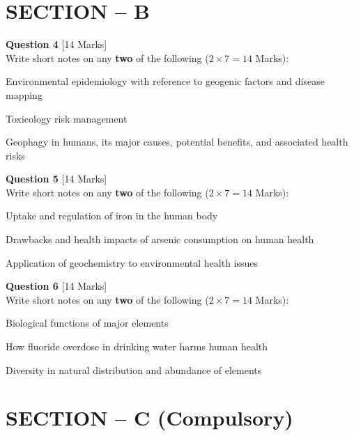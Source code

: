 \documentclass[11pt,a4paper]{article}
\begin{document}
\bigskip
\section*{SECTION -- B}




\noindent   \textbf{Question 4} \hfill [14 Marks]\\
Write short notes on any   \textbf{two} of the following ($2  \times 7 = 14$ Marks):

\begin{parts}
  \item Environmental epidemiology with reference to geogenic factors and disease mapping
  \item Toxicology risk management
  \item Geophagy in humans, its major causes, potential benefits, and associated health risks
\end{parts}

\bigskip




\noindent   \textbf{Question 5} \hfill [14 Marks]\\
Write short notes on any   \textbf{two} of the following ($2  \times 7 = 14$ Marks):

\begin{parts}
  \item Uptake and regulation of iron in the human body
  \item Drawbacks and health impacts of arsenic consumption on human health
  \item Application of geochemistry to environmental health issues
\end{parts}

\bigskip




\noindent   \textbf{Question 6} \hfill [14 Marks]\\
Write short notes on any   \textbf{two} of the following ($2  \times 7 = 14$ Marks):

\begin{parts}
  \item Biological functions of major elements
  \item How fluoride overdose in drinking water harms human health
  \item Diversity in natural distribution and abundance of elements
\end{parts}

\bigskip
\section*{SECTION -- C (Compulsory)}
\end{document}
